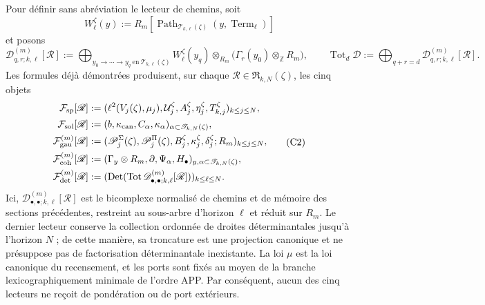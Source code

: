 Pour définir sans abréviation le lecteur de chemins, soit
\[
 W_\ell^\zeta(y):=
 R_m[\operatorname{Path}_{\mathscr T_{k,\ell}(\zeta)}
          (y,\operatorname{Term}_\ell)]
\]
et posons
\[
 \mathscr D_{q,r;k,\ell}^{(m)}[\mathscr R]
 :=\bigoplus_{y_0\to\cdots\to y_q\ \text{en}\
                  \mathscr T_{k,\ell}(\zeta)}
 W_\ell^\zeta(y_q)\otimes_{R_m}
 \bigl(\Gamma_r(y_0)\otimes_{\mathbb Z}R_m\bigr),
 \qquad
 \operatorname{Tot}_d\mathscr D
 :=\bigoplus_{q+r=d}\mathscr D_{q,r;k,\ell}^{(m)}[\mathscr R].
\]
Les formules déjà démontrées produisent, sur chaque
\(\mathscr R\in\mathfrak R_{k,N}(\zeta)\), les cinq objets
\[
\begin{aligned}
 \mathcal F_{\rm sp}[\mathscr R]
 &:=(\ell^2(V_j(\zeta),\mu_j),
       \mathcal U_j^\zeta,A_j^\zeta,\eta_j^\zeta,
       T_{k,j}^\zeta)_{k\leq j\leq N},\\
 \mathcal F_{\rm sol}[\mathscr R]
 &:=(b,\kappa_{\rm can},C_\alpha,\kappa_\alpha)
      _{\alpha\subset\mathscr T_{k,N}(\zeta)},\\
 \mathcal F_{\rm gau}^{(m)}[\mathscr R]
 &:=(\mathscr P_j^\Sigma(\zeta),\mathscr P_j^\Pi(\zeta),
       B_j^\zeta,\kappa_j^\zeta,\delta_j^\zeta;R_m)_{k\leq j\leq N},\\
 \mathcal F_{\rm coh}^{(m)}[\mathscr R]
 &:=(\Gamma_y\otimes R_m,\partial,\Psi_\alpha,H_\bullet)
      _{y,\alpha\subset\mathscr T_{k,N}(\zeta)},\\
 \mathcal F_{\rm det}^{(m)}[\mathscr R]
 &:=(\operatorname{Det}(\operatorname{Tot}
       \mathscr D_{\bullet,\bullet;k,\ell}^{(m)}[\mathscr R]))
       _{k\leq\ell\leq N}.
\end{aligned}
\tag{C2}
\label{eq:cinco-lectores-comunes}
\]
Ici, \(\mathscr D_{\bullet,\bullet;k,\ell}^{(m)}[\mathscr R]\) est le
bicomplexe normalisé
de chemins et de mémoire des sections précédentes, restreint au sous-arbre
d’horizon \(\ell\) et réduit sur \(R_m\). Le dernier lecteur conserve la
collection ordonnée de droites déterminantales jusqu’à l’horizon \(N\) ; de cette
manière, sa troncature est une projection canonique et ne présuppose pas de
factorisation déterminantale inexistante. La loi \(\mu\) est la loi canonique
du recensement, et les ports sont fixés au moyen de la branche lexicographiquement minimale
de l’ordre APP. Par conséquent, aucun des cinq lecteurs ne reçoit de pondération
ou de port extérieurs.


